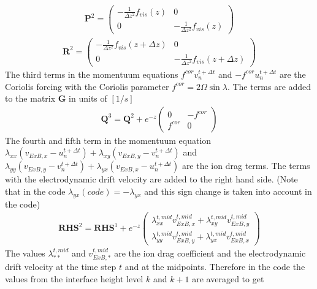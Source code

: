 %
%
\begin{gather}
  \mathbf{P}^2=
   \begin{pmatrix}
       -\frac{1}{\Delta z^2}f_{vis}(z)&  0\\
       0                   & -\frac{1}{\Delta z^2}f_{vis}(z)
   \end{pmatrix}
\end{gather}
%
%
\begin{gather}
  \mathbf{R}^2=
   \begin{pmatrix}
       -\frac{1}{\Delta z^2}f_{vis}(z+\Delta z)&  0\\
       0                   &- \frac{1}{\Delta z^2}f_{vis}(z+\Delta z)
   \end{pmatrix}
\end{gather}
%
The third terms in the momentuum equations $f^{cor}v_n^{t+\Delta t}$
and $- f^{cor}u_n^{t+\Delta t}$ are the Coriolis forcing with the
Coriolis parameter $f^{cor} = 2 \Omega \sin \lambda$. The terms are
added to the matrix $\mathbf{G}$ in units of $[1/s]$
%
\begin{gather}
  \mathbf{Q}^3= \mathbf{Q}^2 + e^{-z}
   \begin{pmatrix}
       0 & - f^{cor} \\
       f^{cor} & 0
   \end{pmatrix}
\end{gather}
%
The fourth and fifth term in the momentuum equation
$\lambda_{xx}(v_{ExB,x}- u_n^{t+\Delta t}) + \lambda_{xy}(v_{ExB,y}-
v_n^{t+\Delta t})$ and $\lambda_{yy}(v_{ExB,y}- v_n^{t+\Delta t}) +
\lambda_{yx}(v_{ExB,x}- u_n^{t+\Delta t})$ are the ion drag terms.
The terms with the electrodynamic drift velocity are added to the
right hand side. (Note that in the code $\lambda_{yx}(code) =-\lambda_{yx} $
and this sign change is taken into account in the code)
%
\begin{gather}
  \mathbf{RHS}^2= \mathbf{RHS}^1 + e^{-z}
   \begin{pmatrix}
     \lambda_{xx}^{t, mid} v_{ExB,x}^{t, mid} + \lambda_{xy}^{t, mid} v_{ExB,y}^{t, mid}  \\
     \lambda_{yy}^{t, mid} v_{ExB,y}^{t, mid} + \lambda_{yx}^{t, mid} v_{ExB,x}^{t, mid}
   \end{pmatrix}
\end{gather}
%
The values $\lambda_{**}^{t, mid} $ and $v_{ExB,*}^{t, mid}$ are the
ion drag coefficient and the electrodynamic drift velocity at the
time step $t$ and at the midpoints. Therefore in the code the values
from the interface height level $k$ and $k+1$ are averaged to get
